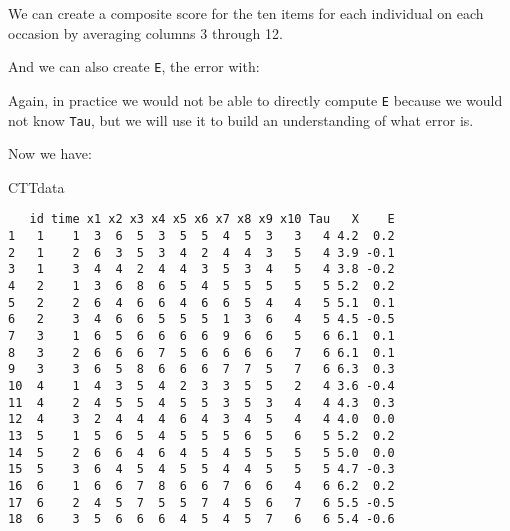 \documentclass[
]{book}
\newenvironment{Shaded}{\begin{snugshade}}{\end{snugshade}}
\newcommand{\DecValTok}[1]{\textcolor[rgb]{0.00,0.00,0.81}{#1}}
\newcommand{\FunctionTok}[1]{\textcolor[rgb]{0.00,0.00,0.00}{#1}}
\newcommand{\NormalTok}[1]{#1}
\newcommand{\OtherTok}[1]{\textcolor[rgb]{0.56,0.35,0.01}{#1}}
\newcommand{\SpecialCharTok}[1]{\textcolor[rgb]{0.00,0.00,0.00}{#1}}
\begin{document}
We can create a composite score for the ten items for each individual on each occasion by averaging columns 3 through 12.

\begin{Shaded}
\end{Shaded}

And we can also create \texttt{E}, the error with:

\begin{Shaded}
\end{Shaded}

Again, in practice we would not be able to directly compute \texttt{E} because we would not know \texttt{Tau}, but we will use it to build an understanding of what error is.

Now we have:

\begin{Shaded}
\begin{Highlighting}[]
\NormalTok{CTTdata}
\end{Highlighting}
\end{Shaded}

\begin{verbatim}
   id time x1 x2 x3 x4 x5 x6 x7 x8 x9 x10 Tau   X    E
1   1    1  3  6  5  3  5  5  4  5  3   3   4 4.2  0.2
2   1    2  6  3  5  3  4  2  4  4  3   5   4 3.9 -0.1
3   1    3  4  4  2  4  4  3  5  3  4   5   4 3.8 -0.2
4   2    1  3  6  8  6  5  4  5  5  5   5   5 5.2  0.2
5   2    2  6  4  6  6  4  6  6  5  4   4   5 5.1  0.1
6   2    3  4  6  6  5  5  5  1  3  6   4   5 4.5 -0.5
7   3    1  6  5  6  6  6  6  9  6  6   5   6 6.1  0.1
8   3    2  6  6  6  7  5  6  6  6  6   7   6 6.1  0.1
9   3    3  6  5  8  6  6  6  7  7  5   7   6 6.3  0.3
10  4    1  4  3  5  4  2  3  3  5  5   2   4 3.6 -0.4
11  4    2  4  5  5  4  5  5  3  5  3   4   4 4.3  0.3
12  4    3  2  4  4  4  6  4  3  4  5   4   4 4.0  0.0
13  5    1  5  6  5  4  5  5  5  6  5   6   5 5.2  0.2
14  5    2  6  6  4  6  4  5  4  5  5   5   5 5.0  0.0
15  5    3  6  4  5  4  5  5  4  4  5   5   5 4.7 -0.3
16  6    1  6  6  7  8  6  6  7  6  6   4   6 6.2  0.2
17  6    2  4  5  7  5  5  7  4  5  6   7   6 5.5 -0.5
18  6    3  5  6  6  6  4  5  4  5  7   6   6 5.4 -0.6
\end{verbatim}
\end{document}

